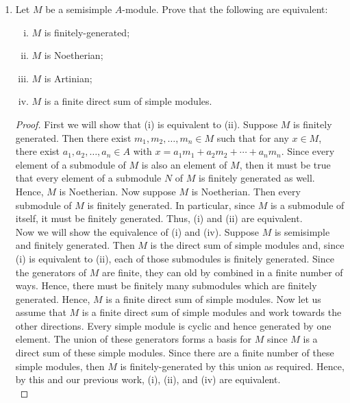 \documentclass[11pt, reqno]{amsart}
\theoremstyle{plain}
\theoremstyle{definition}
\theoremstyle{example}
\begin{document}
\begin{enumerate}[1.]
\begin{proof}
Now we have that the simple modules of $\ZZ$ are of the form $\ZZ/p\ZZ$ for all primes $p \in \ZZ$. Since semisimple modules are direct sums of simple modules, we have that any semisimple module of $\ZZ$ is of the form:
\begin{align*}
p_1 \ZZ \oplus p_2 \ZZ \oplus \cdots \oplus p_{\ell} \ZZ
\end{align*}

for some primes $p_1, \ldots, p_{\ell}$ (not necessarily distinct).
\end{proof}


\item Let $M$ be a semisimple $A$-module. Prove that the following are equivalent: 
\begin{enumerate}[(i)]
\item $M$ is finitely-generated;
\item $M$ is Noetherian;
\item $M$ is Artinian;
\item $M$ is a finite direct sum of simple modules. 
\end{enumerate}

\begin{proof}
First we will show that (i) is equivalent to (ii). Suppose $M$ is finitely generated. Then there exist $m_1, m_2, \ldots, m_n \in M$ such that for any $x \in M$, there exist $a_1, a_2, \ldots, a_n \in A$ with $x = a_1m_1 + a_2m_2 + \cdots + a_nm_n$. Since every element of a submodule of $M$ is also an element of $M$, then it must be true that every element of a submodule $N$ of $M$ is finitely generated as well. Hence, $M$ is Noetherian. Now suppose $M$ is Noetherian. Then every submodule of $M$ is finitely generated. In particular, since $M$ is a submodule of itself, it must be finitely generated. Thus, (i) and (ii) are equivalent.\\

Now we will show the equivalence of (i) and (iv). Suppose $M$ is semisimple and finitely generated. Then $M$ is the direct sum of simple modules and, since (i) is equivalent to (ii), each of those submodules is finitely generated. Since the generators of $M$ are finite, they can old by combined in a finite number of ways. Hence, there must be finitely many submodules which are finitely generated. Hence, $M$ is a finite direct sum of simple modules. Now let us assume that $M$ is a finite direct sum of simple modules and work towards the other directions. Every simple module is cyclic and hence generated by one element. The union of these generators forms a basis for $M$ since $M$ is a direct sum of these simple modules. Since there are a finite number of these simple modules, then $M$ is finitely-generated by this union as required. Hence, by this and our previous work, (i), (ii), and (iv) are equivalent.\\


\end{proof}
\end{enumerate}
\end{document}
